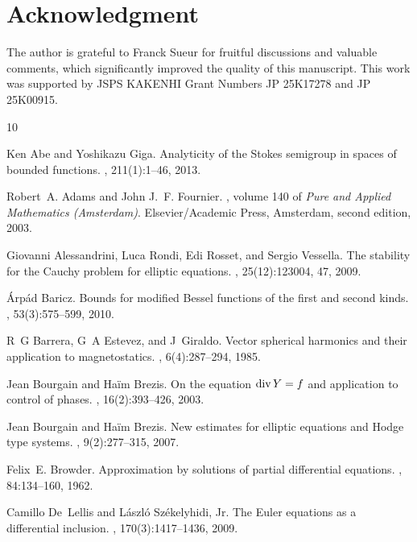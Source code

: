 \documentclass[11pt,a4paper]{article}
\numberwithin{equation}{section}
\begin{document}
    \section*{Acknowledgment}


The author is grateful to Franck Sueur for fruitful discussions and valuable comments, which significantly improved the quality of this manuscript. This work was supported by JSPS KAKENHI Grant Numbers JP 25K17278 and JP 25K00915. 


    \begin{thebibliography}{10}

Ken Abe and Yoshikazu Giga.
\newblock Analyticity of the {S}tokes semigroup in spaces of bounded functions.
, 211(1):1--46, 2013.

Robert~A. Adams and John J.~F. Fournier.
, volume 140 of {\em Pure and Applied Mathematics (Amsterdam)}.
\newblock Elsevier/Academic Press, Amsterdam, second edition, 2003.

Giovanni Alessandrini, Luca Rondi, Edi Rosset, and Sergio Vessella.
\newblock The stability for the {C}auchy problem for elliptic equations.
, 25(12):123004, 47, 2009.

\'Arp\'ad Baricz.
\newblock Bounds for modified {B}essel functions of the first and second kinds.
, 53(3):575--599, 2010.

R~G Barrera, G~A Estevez, and J~Giraldo.
\newblock Vector spherical harmonics and their application to magnetostatics.
, 6(4):287--294, 1985.

Jean Bourgain and Ha\"im Brezis.
\newblock On the equation {${\rm div}\, Y=f$} and application to control of phases.
, 16(2):393--426, 2003.

Jean Bourgain and Ha\"im Brezis.
\newblock New estimates for elliptic equations and {H}odge type systems.
, 9(2):277--315, 2007.

Felix~E. Browder.
\newblock Approximation by solutions of partial differential equations.
, 84:134--160, 1962.

Camillo De~Lellis and L\'aszl\'o Sz\'ekelyhidi, Jr.
\newblock The {E}uler equations as a differential inclusion.
, 170(3):1417--1436, 2009.


\end{thebibliography}
\end{document}
